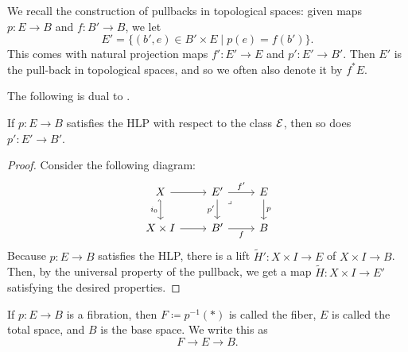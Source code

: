 \documentclass[ma3408.tex]{subfiles}
\begin{document}
\begin{Def}
We recall the construction of pullbacks in topological spaces: given maps $p \colon E \to B$ and $f \colon B' \to B$, we let 
\[
E' = \{(b',e) \in B' \times E \mid p(e) = f(b') \}.
\]
This comes with natural projection maps $f' \colon E' \to E$ and $p' \colon E' \to B'$. Then $E'$ is the pull-back in topological spaces, and so we often also denote it by $f^*E$. 
\end{Def}
The following is dual to .
\begin{Lem}
If $p \colon E \to B$ satisfies the HLP with respect to the class $\cal E$, then so does $p' \colon E' \to B'$. 
\end{Lem}
\begin{proof}
Consider the following diagram:
\[\begin{tikzcd}
	X & {E'} & E \\
	{X \times I} & {B'} & B
	\arrow["p", from=1-3, to=2-3]
	\arrow["{i_0}"', hook', from=1-1, to=2-1]
	\arrow["f"', from=2-2, to=2-3]
	\arrow["{f'}", from=1-2, to=1-3]
	\arrow["{p'}"', from=1-2, to=2-2]
	\arrow["\lrcorner"{anchor=center, pos=0.125}, draw=none, from=1-2, to=2-3]
	\arrow[from=1-1, to=1-2]
	\arrow[from=2-1, to=2-2]
\end{tikzcd}\]
Because $p \colon E \to B$ satisfies the HLP, there is a lift $\tilde H' \colon X \times I \to E$ of $X \times I \to B$. Then, by the universal property of the pullback, we get a map $\tilde H \colon X \times I \to E'$ satisfying the desired properties. 
\end{proof}
\begin{Def}
	If $p \colon E \to B$ is a fibration, then $F \coloneqq p^{-1}(\ast)$ is called the fiber, $E$ is called the total space, and $B$ is the base space. We write this as 
	\[
F \to E \to B.
	\]
\end{Def}
\end{document}
